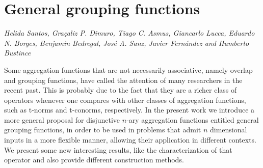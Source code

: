 \documentclass[../booklet.tex]{subfiles}
\begin{document}
\section[General grouping functions. {\it Helida Santos, Graçaliz P. Dimuro, Tiago C. Asmus, Giancarlo Lucca, Eduardo N. Borges, Benjamin Bedregal, José A. Sanz, Javier Fernández and Humberto Bustince}]{General grouping functions}
        

\begin{center}
  {\it Helida Santos, Graçaliz P. Dimuro, Tiago C. Asmus, Giancarlo Lucca, Eduardo N. Borges, Benjamin Bedregal, José A. Sanz, Javier Fernández and Humberto Bustince}
\end{center}

\vskip 0.8cm


Some aggregation functions that are not necessarily associative, namely overlap and grouping functions, have called the attention of many researchers in the recent past. This is probably due to the fact that they are a richer class of operators whenever one compares with other classes of aggregation functions, such as t-norms and t-conorms, respectively. In the present work we introduce a more general proposal for disjunctive $n$-ary aggregation functions entitled general grouping functions, in order to be used in problems that admit $n$ dimensional inputs in a more flexible manner, allowing their application in different contexts. We present some new interesting results, like the characterization of that operator and also provide different construction methods.

\end{document}
